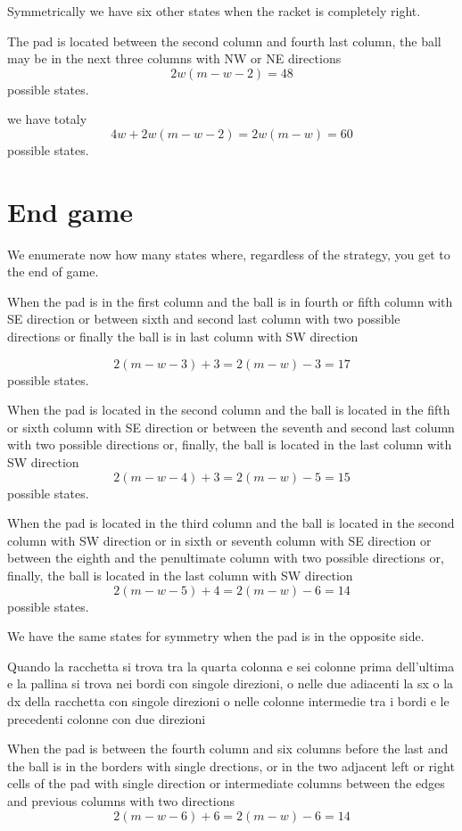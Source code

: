 \documentclass[a4paper,11pt]{article}
\begin{document}
Symmetrically we have six other states when the racket is completely right.

The pad is located between the second column and fourth last column, the ball may be in the next three columns with NW or NE directions
\[
2w(m-w-2) = 48
\]
possible states.

we have totaly
\[
4w+2w(m-w-2) = 2w(m-w)=60
\]
possible states.


\section{End game}

We enumerate now how many states where, regardless of the strategy, you get to the end of game.

When the pad is in the first column and the ball is in fourth or fifth column with SE direction or between sixth and second last column with two possible directions or finally the ball is in last column with SW direction

\[
2(m-w-3)+3=2(m-w)-3=17
\]
possible states.

When the pad is located in the second column and the ball is located in the fifth or sixth column with SE direction or between the seventh and second last column with two possible directions or, finally, the ball is located in the last column with SW direction
\[
2(m-w-4)+3 = 2(m-w)-5 = 15
\]
possible states.

When the pad is located in the third column and the ball is located in the second column with SW direction or in sixth or seventh column with SE direction or between the eighth and the penultimate column with two possible directions or, finally, the ball is located in the last column with SW direction
\[
2(m-w-5)+4= 2(m-w)-6 = 14
\]
possible states.

We have the same states for symmetry when the pad is in the opposite side.

Quando la racchetta si trova tra la quarta colonna e sei colonne prima dell'ultima e la pallina si trova nei bordi con singole direzioni, o nelle due adiacenti la sx o la dx della racchetta con singole direzioni o nelle colonne intermedie tra i bordi e le precedenti colonne con due direzioni

When the pad is between the fourth column and six columns before the last and the ball is in the borders with single drections, or in the two adjacent left or right cells of the pad with single direction or intermediate columns between the edges and previous columns with two directions
\[
2(m-w-6)+6 = 2(m-w)-6=14
\]
\end{document}
